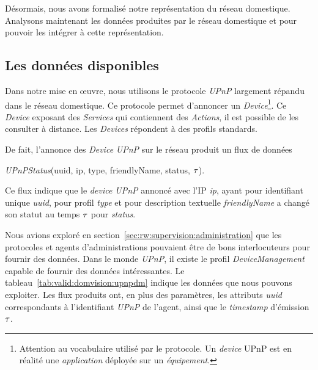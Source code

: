 Désormais, nous avons formalisé notre représentation du réseau domestique. Analysons maintenant les données produites par le réseau domestique et pour pouvoir les intégrer à cette représentation.

\subsection{Les données disponibles}\label{sec:valid:domvision:systeme:data}
Dans notre mise en œuvre, nous utilisons le protocole \textit{UPnP} largement répandu dans le réseau domestique. Ce protocole permet d'annoncer un \textit{Device}\footnote{Attention au vocabulaire utilisé par le protocole. Un \textit{device} UPnP est en réalité une \textit{application} déployée sur un \textit{équipement}.}. Ce \textit{Device} exposant des \textit{Services} qui contiennent des \textit{Actions}, il est possible de les consulter à distance. Les \textit{Devices} répondent à des profils standards.

De fait, l'annonce des \textit{Device} \textit{UPnP} sur le réseau produit un flux de données \begin{center}\textit{UPnPStatus}(uuid, ip, type, friendlyName, status, $\tau$).\end{center} Ce flux indique que le \textit{device UPnP} annoncé avec l'IP \textit{ip}, ayant pour identifiant unique \textit{uuid}, pour profil \textit{type} et pour description textuelle \textit{friendlyName} a changé son statut au temps $\tau$ pour \textit{status}.

Nous avions exploré en section~\ref{sec:rw:supervision:administration} que les protocoles et agents d'administrations pouvaient être de bons interlocuteurs pour fournir des données. Dans le monde \textit{UPnP}, il existe le profil \textit{DeviceManagement} capable de fournir des données intéressantes. Le tableau~\ref{tab:valid:domvision:upnpdm} indique les données que nous pouvons exploiter. Les flux produits ont, en plus des paramètres, les attributs \textit{uuid} correspondants à l'identifiant \textit{UPnP} de l'agent, ainsi que le \textit{timestamp} d'émission $\tau$.

